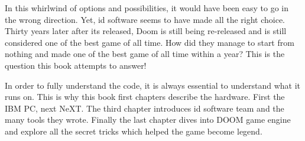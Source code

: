  In this whirlwind of options and possibilities, it would have been easy to go in the wrong direction. Yet, id software seems to have made all the right choice. Thirty years later after its released, Doom is still being re-released and is still considered one of the best game of all time. How did they manage to start from nothing and made one of the best game of all time within a year? This is the question this book attempts to answer!\\
 \par
 In order to fully understand the code, it is always essential to understand what it runs on. This is why this book first chapters describe the hardware. First the IBM PC, next NeXT. The third chapter introduces id software team and the many tools they wrote. Finally the last chapter dives into DOOM game engine and explore all the secret tricks which helped the game become legend.
